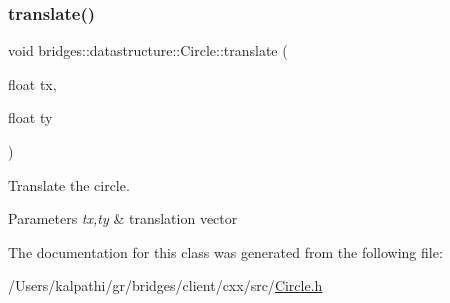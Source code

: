 \subsubsection{\texorpdfstring{translate()}{translate()}}
{\footnotesize\ttfamily void bridges\+::datastructure\+::\+Circle\+::translate (\begin{DoxyParamCaption}\item[{float}]{tx,  }\item[{float}]{ty }\end{DoxyParamCaption})\hspace{0.3cm}{\ttfamily [inline]}}



Translate the circle. 


\begin{DoxyParams}{Parameters}
{\em tx,ty} & translation vector \\
\hline
\end{DoxyParams}


The documentation for this class was generated from the following file\+:\begin{DoxyCompactItemize}
\item 
/\+Users/kalpathi/gr/bridges/client/cxx/src/\mbox{\hyperlink{_circle_8h}{Circle.\+h}}\end{DoxyCompactItemize}
